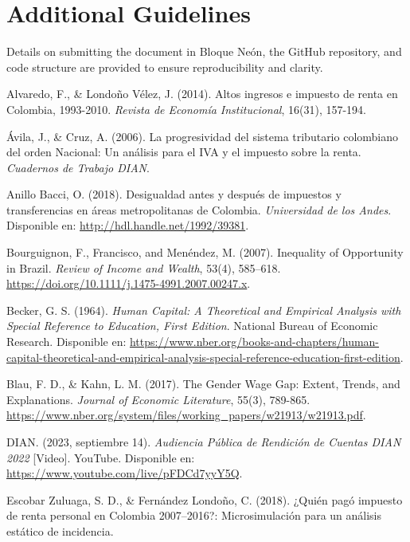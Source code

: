 \documentclass[a4paper,12pt]{article}
\begin{document}
 
\section{Additional Guidelines}
Details on submitting the document in Bloque Ne\'on, the GitHub repository, and code structure are provided to ensure reproducibility and clarity.


\begin{thebibliography}{19}

Alvaredo, F., \& Londoño Vélez, J. (2014). Altos ingresos e impuesto de renta en Colombia, 1993-2010. \textit{Revista de Economía Institucional}, 16(31), 157-194.

Ávila, J., \& Cruz, A. (2006). La progresividad del sistema tributario colombiano del orden Nacional: Un análisis para el IVA y el impuesto sobre la renta. \textit{Cuadernos de Trabajo DIAN}.

Anillo Bacci, O. (2018). Desigualdad antes y después de impuestos y transferencias en áreas metropolitanas de Colombia. \textit{Universidad de los Andes}. Disponible en: \url{http://hdl.handle.net/1992/39381}.

Bourguignon, F., Francisco, and Menéndez, M. (2007). Inequality of Opportunity in Brazil. \textit{Review of Income and Wealth}, 53(4), 585–618. \url{https://doi.org/10.1111/j.1475-4991.2007.00247.x}.

Becker, G. S. (1964). \textit{Human Capital: A Theoretical and Empirical Analysis with Special Reference to Education, First Edition}. National Bureau of Economic Research. Disponible en: \url{https://www.nber.org/books-and-chapters/human-capital-theoretical-and-empirical-analysis-special-reference-education-first-edition}.

Blau, F. D., \& Kahn, L. M. (2017). The Gender Wage Gap: Extent, Trends, and Explanations. \textit{Journal of Economic Literature}, 55(3), 789-865. \url{https://www.nber.org/system/files/working_papers/w21913/w21913.pdf}.

DIAN. (2023, septiembre 14). \textit{Audiencia Pública de Rendición de Cuentas DIAN 2022} [Video]. YouTube. Disponible en: \url{https://www.youtube.com/live/pFDCd7yyY5Q}.

Escobar Zuluaga, S. D., \& Fernández Londoño, C. (2018). ¿Quién pagó impuesto de renta personal en Colombia 2007–2016?: Microsimulación para un análisis estático de incidencia.


\end{thebibliography}
\end{document}
